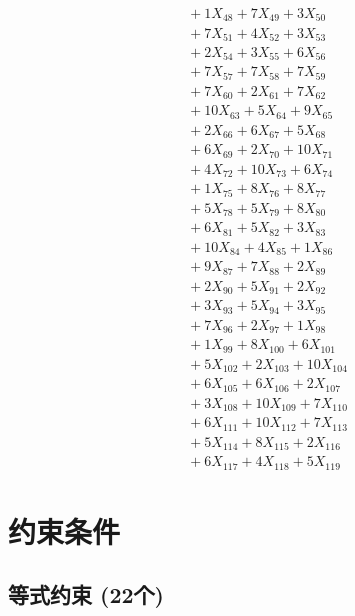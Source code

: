 \documentclass[a4paper,10pt]{article}
\begin{document}
{\begin{align}
&\;  + 1 X_{48} + 7 X_{49} + 3 X_{50} \\[0.3ex]
&\;  + 7 X_{51} + 4 X_{52} + 3 X_{53} \\[0.3ex]
&\;  + 2 X_{54} + 3 X_{55} + 6 X_{56} \\[0.3ex]
&\;  + 7 X_{57} + 7 X_{58} + 7 X_{59} \\[0.5ex]\allowbreak
&\;  + 7 X_{60} + 2 X_{61} + 7 X_{62} \\[0.3ex]
&\;  + 10 X_{63} + 5 X_{64} + 9 X_{65} \\[0.3ex]
&\;  + 2 X_{66} + 6 X_{67} + 5 X_{68} \\[0.3ex]
&\;  + 6 X_{69} + 2 X_{70} + 10 X_{71} \\[0.3ex]
&\;  + 4 X_{72} + 10 X_{73} + 6 X_{74} \\[0.3ex]
&\;  + 1 X_{75} + 8 X_{76} + 8 X_{77} \\[0.3ex]
&\;  + 5 X_{78} + 5 X_{79} + 8 X_{80} \\[0.3ex]
&\;  + 6 X_{81} + 5 X_{82} + 3 X_{83} \\[0.3ex]
&\;  + 10 X_{84} + 4 X_{85} + 1 X_{86} \\[0.3ex]
&\;  + 9 X_{87} + 7 X_{88} + 2 X_{89} \\[0.5ex]\allowbreak
&\;  + 2 X_{90} + 5 X_{91} + 2 X_{92} \\[0.3ex]
&\;  + 3 X_{93} + 5 X_{94} + 3 X_{95} \\[0.3ex]
&\;  + 7 X_{96} + 2 X_{97} + 1 X_{98} \\[0.3ex]
&\;  + 1 X_{99} + 8 X_{100} + 6 X_{101} \\[0.3ex]
&\;  + 5 X_{102} + 2 X_{103} + 10 X_{104} \\[0.3ex]
&\;  + 6 X_{105} + 6 X_{106} + 2 X_{107} \\[0.3ex]
&\;  + 3 X_{108} + 10 X_{109} + 7 X_{110} \\[0.3ex]
&\;  + 6 X_{111} + 10 X_{112} + 7 X_{113} \\[0.3ex]
&\;  + 5 X_{114} + 8 X_{115} + 2 X_{116} \\[0.3ex]
&\;  + 6 X_{117} + 4 X_{118} + 5 X_{119}\nonumber
\end{align}
}

\section{约束条件}

\subsection{等式约束 (22个)}
\end{document}
